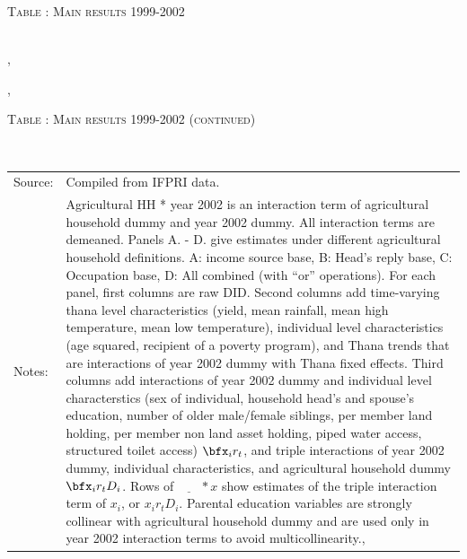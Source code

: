 \begin{table}\hfil\textsc{\footnotesize Table \thetable: Main results 1999-2002\label{zEm.1999.10.sameN}}\\\setlength{\tabcolsep}{.5pt}\renewcommand{\arraystretch}{.675}\hspace{-2em}\hfil\\\renewcommand{\arraystretch}{1}\end{table}, \addtocounter{table}{-1}, \begin{table}\hfil\textsc{\footnotesize Table \thetable: Main results 1999-2002 (continued)\label{zEm.1999.10.sameN}}\\\setlength{\tabcolsep}{.5pt}\renewcommand{\arraystretch}{.675}\hspace{-3cm}\hfil{}\\\renewcommand{\arraystretch}{1}\hfil\begin{tabular}{>{\hfill\scriptsize}p{1cm}<{}>{\scriptsize}p{12cm}<{\hfill}} Source:& Compiled from IFPRI data. \\[-1ex] Notes:&   \textsf{Agricultural HH * year 2002} is an interaction term of agricultural household dummy and year 2002 dummy. All interaction terms are demeaned. Panels A. - D. give estimates under different agricultural household definitions. A: income source base, B: Head's reply base, C: Occupation base, D: All combined (with ``or'' operations). For each panel, first columns are raw DID. Second columns add time-varying thana level characteristics (yield, mean rainfall, mean high temperature, mean low temperature), individual level characteristics (age squared, recipient of a poverty program), and \textsf{Thana trends} that are interactions of year 2002 dummy with Thana fixed effects. Third columns add interactions of year 2002 dummy and individual level characterstics (sex of individual, household head's and spouse's education, number of older male/female siblings, per member land holding, per member non land asset holding, piped water access, structured toilet access) $\bfx_{i}r_{t}$, and triple interactions of year 2002 dummy, individual characteristics, and agricultural household dummy $\bfx_{i}r_{t}D_{i}$. Rows of $\underline{\phantom{mm}}*x$ show estimates of the triple interaction term of $x_{i}$, or $x_{i}r_{t}D_{i}$. Parental education variables are strongly collinear with agricultural household dummy and are used only in year 2002 interaction terms to avoid multicollinearity., \\   \end{tabular} \end{table}



